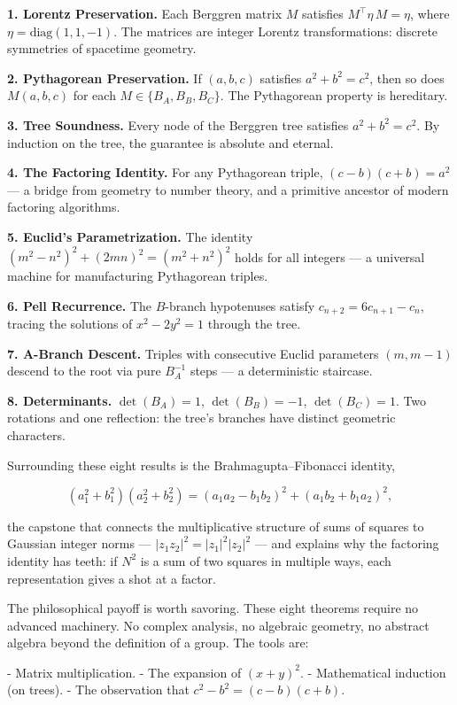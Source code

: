 \documentclass[12pt, letterpaper, openany]{book}
\theoremstyle{definition}
\theoremstyle{remark}
\begin{document}
\textbf{1. Lorentz Preservation.} Each Berggren matrix $M$ satisfies $M^\top \eta\, M = \eta$, where $\eta = \mathrm{diag}(1, 1, -1)$. The matrices are integer Lorentz transformations: discrete symmetries of spacetime geometry.

\textbf{2. Pythagorean Preservation.} If $(a, b, c)$ satisfies $a^2 + b^2 = c^2$, then so does $M(a, b, c)$ for each $M \in \{B_A, B_B, B_C\}$. The Pythagorean property is hereditary.

\textbf{3. Tree Soundness.} Every node of the Berggren tree satisfies $a^2 + b^2 = c^2$. By induction on the tree, the guarantee is absolute and eternal.

\textbf{4. The Factoring Identity.} For any Pythagorean triple, $(c - b)(c + b) = a^2$ --- a bridge from geometry to number theory, and a primitive ancestor of modern factoring algorithms.

\textbf{5. Euclid's Parametrization.} The identity $(m^2 - n^2)^2 + (2mn)^2 = (m^2 + n^2)^2$ holds for all integers --- a universal machine for manufacturing Pythagorean triples.

\textbf{6. Pell Recurrence.} The $B$-branch hypotenuses satisfy $c_{n+2} = 6c_{n+1} - c_n$, tracing the solutions of $x^2 - 2y^2 = 1$ through the tree.

\textbf{7. A-Branch Descent.} Triples with consecutive Euclid parameters $(m, m-1)$ descend to the root via pure $B_A^{-1}$ steps --- a deterministic staircase.

\textbf{8. Determinants.} $\det(B_A) = 1$, $\det(B_B) = -1$, $\det(B_C) = 1$. Two rotations and one reflection: the tree's branches have distinct geometric characters.

Surrounding these eight results is the Brahmagupta--Fibonacci identity,

\[
(a_1^2 + b_1^2)(a_2^2 + b_2^2) = (a_1 a_2 - b_1 b_2)^2 + (a_1 b_2 + b_1 a_2)^2,
\]

the capstone that connects the multiplicative structure of sums of squares to Gaussian integer norms --- $|z_1 z_2|^2 = |z_1|^2 |z_2|^2$ --- and explains why the factoring identity has teeth: if $N^2$ is a sum of two squares in multiple ways, each representation gives a shot at a factor.

The philosophical payoff is worth savoring. These eight theorems require no advanced machinery. No complex analysis, no algebraic geometry, no abstract algebra beyond the definition of a group. The tools are:

- Matrix multiplication.
- The expansion of $(x + y)^2$.
- Mathematical induction (on trees).
- The observation that $c^2 - b^2 = (c - b)(c + b)$.
\end{document}
